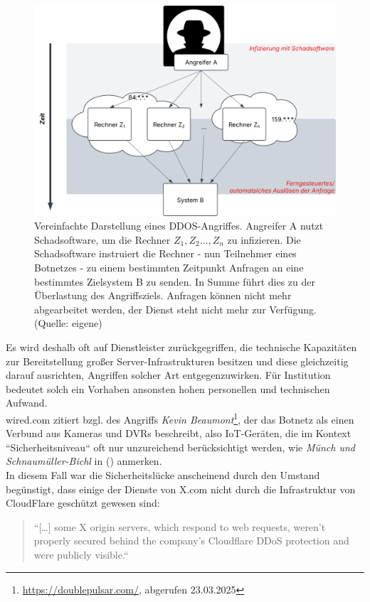 \begin{figure}
    \centering
    \includegraphics[scale=0.3]{aufgabe 2/img/ddos.svg}
    \caption{Vereinfachte Darstellung eines DDOS-Angriffes. Angreifer A nutzt Schadsoftware, um die Rechner $Z_1, Z_2 \ldots, Z_n$ zu infizieren. Die Schadsoftware  instruiert die Rechner - nun Teilnehmer eines Botnetzes - zu einem bestimmten Zeitpunkt Anfragen an eine bestimmtes Zielsystem B zu senden. In Summe führt dies zu der Überlastung des Angriffsziels. Anfragen können nicht mehr abgearbeitet werden, der Dienst steht nicht mehr zur Verfügung. (Quelle: eigene)}
    \label{fig:ddos}
\end{figure}


\noindent
Es wird deshalb oft auf Dienstleister zurückgegriffen, die technische Kapazitäten zur Bereitstellung großer Server-Infrastrukturen besitzen und diese gleichzeitig darauf ausrichten, Angriffen solcher Art entgegenzuwirken.
Für Institution bedeutet solch ein Vorhaben ansonsten hohen personellen und technischen Aufwand.\\

\noindent
wired.com zitiert bzgl. des Angriffs \textit{Kevin Beaumont}\footnote{
    \url{https://doublepulsar.com/}, abgerufen 23.03.2025
}, der das Botnetz als einen Verbund aus Kameras und DVRs beschreibt, also IoT-Geräten, die im Kontext ``Sicherheitsniveau`` oft nur unzureichend berücksichtigt werden, wie \textit{Münch und Schnaumüller-Bichl} in  (\cite[36]{ITS2}) anmerken.\\
In diesem Fall war die Sicherheitslücke anscheinend durch den Umstand begünstigt, dass einige der Dienste von X.com nicht durch die Infrastruktur von CloudFlare geschützt gewesen sind:

\blockquote[]{
``[\ldots] some X origin servers, which respond to web requests, weren't properly secured behind the company's Cloudflare DDoS protection and were publicly visible.``
}
